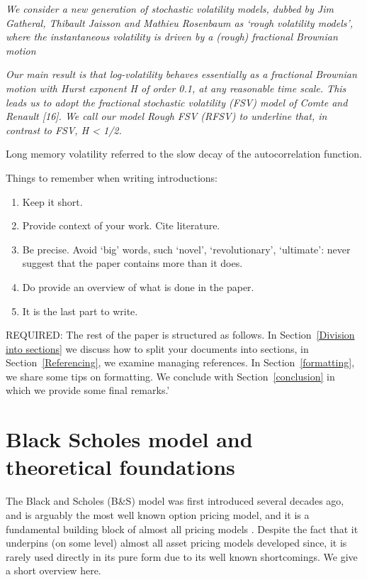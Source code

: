 \documentclass[12pt,oneside]{article}
\begin{document}
\emph{We consider a new generation of stochastic volatility models, dubbed by Jim Gatheral, Thibault Jaisson and Mathieu Rosenbaum as `rough volatility models’, where the instantaneous volatility is driven by a (rough) fractional Brownian motion} %

\emph{Our main result is
that log-volatility behaves essentially as a fractional Brownian motion
with Hurst exponent H of order 0.1, at any reasonable time scale.
This leads us to adopt the fractional stochastic volatility (FSV) model
of Comte and Renault [16]. We call our model Rough FSV (RFSV)
to underline that, in contrast to FSV, H < 1/2.}

Long memory volatility referred to the slow decay of the autocorrelation function.

Things to remember when writing introductions:
\begin{enumerate} %
\item Keep it short.
\item Provide context of your work. Cite literature.
\item Be precise. Avoid `big' words, such `novel', `revolutionary', `ultimate': never suggest that the paper contains more than it does.
\item Do provide an overview of what is done in the paper.
\item It is the last part to write.
\end{enumerate}

REQUIRED: The rest of the paper is structured as follows. In Section~\ref{Division into sections} we discuss how to split your documents into sections, in Section~\ref{Referencing}, we examine  managing  references. In Section~\ref{formatting}, we share some tips on formatting. We conclude with Section~\ref{conclusion} in which we provide some final remarks.'



\section{Black Scholes model and theoretical foundations}
\label{sec:black_scholes_foundations}
The Black and Scholes (B&S) model was first introduced several decades ago, and is arguably the most well known option pricing model, and it is a fundamental building block of almost all pricing models \cite{BlackScholesOR}. Despite the fact that it underpins (on some level) almost all asset pricing models developed since, it is rarely used directly in its pure form due to its well known shortcomings. We give a short overview here. 
\end{document}
